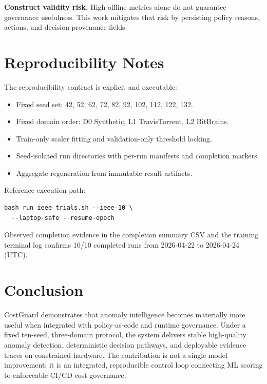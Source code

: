 \documentclass[10pt,twocolumn]{article}
\begin{document}
\textbf{Construct validity risk.}
High offline metrics alone do not guarantee governance usefulness. This work mitigates that risk by persisting policy reasons, actions, and decision provenance fields.

\FloatBarrier
\section{Reproducibility Notes}
The reproducibility contract is explicit and executable:
\begin{itemize}
\item Fixed seed set: 42, 52, 62, 72, 82, 92, 102, 112, 122, 132.
\item Fixed domain order: D0 Synthetic, L1 TravisTorrent, L2 BitBrains.
\item Train-only scaler fitting and validation-only threshold locking.
\item Seed-isolated run directories with per-run manifests and completion markers.
\item Aggregate regeneration from immutable result artifacts.
\end{itemize}

Reference execution path:
\begin{verbatim}
bash run_ieee_trials.sh --ieee-10 \
  --laptop-safe --resume-epoch
\end{verbatim}

Observed completion evidence in the completion summary CSV and the
training terminal log confirms 10/10 completed runs from 2026-04-22 to
2026-04-24 (UTC).

\FloatBarrier
\section{Conclusion}
CostGuard demonstrates that anomaly intelligence becomes materially more useful when integrated with policy-as-code and runtime governance. Under a fixed ten-seed, three-domain protocol, the system delivers stable high-quality anomaly detection, deterministic decision pathways, and deployable evidence traces on constrained hardware. The contribution is not a single model improvement; it is an integrated, reproducible control loop connecting ML scoring to enforceable CI/CD cost governance.
\end{document}
